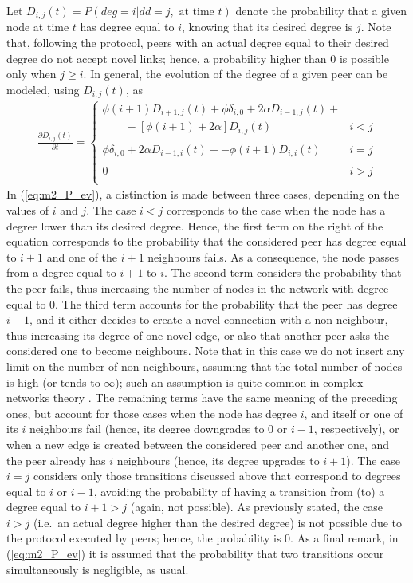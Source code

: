 \documentclass[a4paper,twosided]{article}
\begin{document}
Let $D_{i,j}(t)=P(deg=i | dd=j, \textrm{ at time } t)$ denote the probability that a given node at time $t$ has degree equal to $i$, knowing that its desired degree is $j$. Note that, following the protocol, peers with an actual degree equal to their desired degree do not accept novel links; hence, a probability higher than $0$ is possible only when $j\geq i$. In general, the evolution of the degree of a given peer can be modeled, using $D_{i,j}(t)$, as
\begin{eqnarray}
\frac{\partial D_{i,j}(t)}{\partial t} = \left\{ \begin{array}{ll}
	    \textstyle \phi (i+1) D_{i+1,j}(t) + \phi\delta_{i,0} + 2\alpha D_{i-1,j}(t) +
		\\ \quad \quad -[\phi (i+1) + 2\alpha ] D_{i,j}(t) & i<j\\
& \\
		\phi\delta_{i,0} + 2\alpha D_{i-1,i}(t) + -\phi (i+1) D_{i,i}(t) & i=j\\ 
& \\
                                                0 &  i>j\\ 
\end{array} \right.
\label{eq:m2_P_ev}
\end{eqnarray}
In (\ref{eq:m2_P_ev}), a distinction is made between three cases, depending on the values of $i$ and $j$. 
The case $i<j$ corresponds to the case when the node has a degree lower than its desired degree. Hence,
the first term on the right of the equation corresponds to the probability that the considered peer has degree equal to $i+1$ and one of the $i+1$ neighbours fails. As a consequence, the node passes from a degree equal to $i+1$ to $i$. The second term considers the probability that the peer fails, thus increasing the number of nodes in the network with degree equal to $0$. The third term accounts for the probability that the peer has degree $i-1$, and it either decides to create a novel connection with a non-neighbour, thus increasing its degree of one novel edge, or also that another peer asks the considered one to become neighbours. Note that in this case we do not insert any limit on the number of non-neighbours, assuming that the total number of nodes is high (or tends to $\infty$); such an  assumption is quite common in complex networks theory \cite{Newman03thestructure}. The remaining terms have the same meaning of the preceding ones, but account for those cases when the node has degree $i$, and itself or one of its $i$ neighbours fail (hence, its degree downgrades to $0$ or $i-1$, respectively), or when a new edge is created between the considered peer and another one, and the peer already has $i$ neighbours (hence, its degree upgrades to $i+1$).  
The case $i=j$ considers only those transitions discussed above that correspond to degrees equal to $i$ or $i-1$, avoiding the probability of having a transition from (to) a degree equal to $i+1>j$ (again, not possible). 
As previously stated, the case $i>j$ (i.e.~an actual degree higher than the desired degree) is not possible due to the protocol executed by peers; hence, the probability is $0$. As a final remark, in (\ref{eq:m2_P_ev}) it is assumed that the probability that two transitions occur simultaneously is negligible, as usual.
\end{document}

